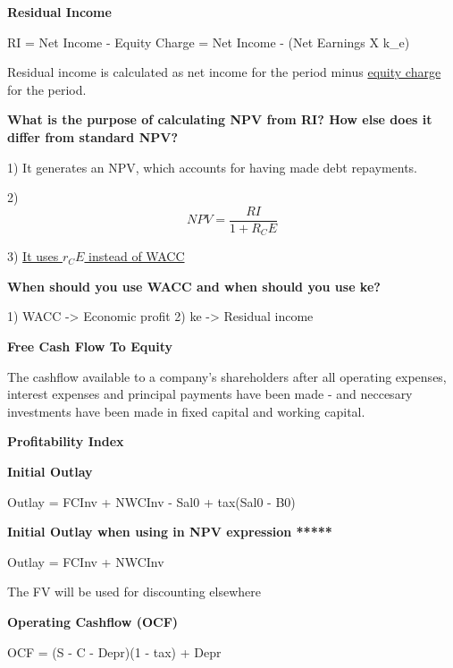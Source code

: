 \documentclass[12pt]{article}
\begin{document}
							 			\begin{framed}
							 				
							 			\textbf{Residual Income}
							 			
							 			RI = Net Income - Equity Charge = Net Income - (Net Earnings X k_e)
							 			
							 			Residual income is calculated as net income for the period minus \underline{equity charge} for the period.
							 			
							 			\textbf{What is the purpose of calculating NPV from RI? How else does it differ from standard NPV?}
							 			
							 			1) It generates an NPV, which accounts for having made debt repayments. 
							 			
							 			2) $$
							 			NPV = \dfrac{RI}{1 + R_CE}
							 			$$
							 			
							 			3) \underline{It uses $r_CE$ instead of WACC}
							 			
							 			\textbf{When should you use WACC and when should you use ke?}
							 			
							 			1) WACC -> Economic profit
							 			2) ke -> Residual income
							 			
							 			\end{framed}
							 			
							 			
							 			\textbf{Free Cash Flow To Equity}
							 			
							 			The cashflow available to a company's shareholders after all operating expenses, interest expenses and principal payments have been made - and neccesary investments have been made in fixed capital and working capital.
							 			
							 			\textbf{Profitability Index}
							 			
							 			\textbf{Initial Outlay}
							 			
							 			Outlay = FCInv + NWCInv - Sal0 + tax(Sal0 - B0)
							 			
							 			\textbf{Initial Outlay when using in NPV expression *****}
							 			
							 			Outlay = FCInv + NWCInv 
							 			
							 			The FV will be used for discounting elsewhere
							 			
							 			\textbf{Operating Cashflow (OCF)}
							 			
							 			OCF =  (S - C - Depr)(1 - tax) + Depr
							 			
\end{document}
